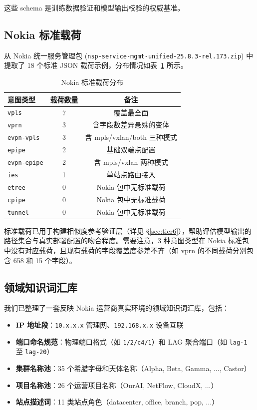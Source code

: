 \documentclass[12pt, a4paper]{article}
\newcommand{\intenttype}[1]{\texttt{#1}}
\begin{document}
\noindent
这些 schema 是训练数据验证和模型输出校验的权威基准。

\subsection{Nokia 标准载荷}

从 Nokia 统一服务管理包 (\texttt{nsp-service-mgmt-unified-25.8.3-rel.173.zip}) 中提取了 18 个标准 JSON 载荷示例，分布情况如表~\ref{tab:canonical-payloads} 所示。

\begin{table}[H]
\centering
\caption{Nokia 标准载荷分布}
\label{tab:canonical-payloads}
\small
\begin{tabular}{lcc}
\toprule
\textbf{意图类型} & \textbf{载荷数量} & \textbf{备注} \\
\midrule
\intenttype{vpls}        & 7 & 覆盖最全面 \\
\intenttype{vprn}        & 3 & 含字段数差异悬殊的变体 \\
\intenttype{evpn-vpls}   & 3 & 含 mpls/vxlan/both 三种模式 \\
\intenttype{epipe}       & 2 & 基础双端点配置 \\
\intenttype{evpn-epipe}  & 2 & 含 mpls/vxlan 两种模式 \\
\intenttype{ies}         & 1 & 单站点路由接入 \\
\midrule
\intenttype{etree}       & 0 & Nokia 包中无标准载荷 \\
\intenttype{cpipe}       & 0 & Nokia 包中无标准载荷 \\
\intenttype{tunnel}      & 0 & Nokia 包中无标准载荷 \\
\bottomrule
\end{tabular}
\end{table}

\noindent
标准载荷已用于构建相似度参考验证层（详见 \S\ref{sec:tier6}），帮助评估模型输出的路径集合与真实部署配置的吻合程度。需要注意，3 种意图类型在 Nokia 标准包中没有对应载荷，且现有载荷的字段覆盖度参差不齐（如 vprn 的不同载荷分别包含 658 和 15 个字段）。

\subsection{领域知识词汇库}

我们已整理了一套反映 Nokia 运营商真实环境的领域知识词汇库，包括：

\begin{itemize}
  \item \textbf{IP 地址段}：\texttt{10.x.x.x} 管理网、\texttt{192.168.x.x} 设备互联
  \item \textbf{端口命名规范}：物理端口格式（如 \texttt{1/2/c4/1}）和 LAG 聚合端口（如 \texttt{lag-1} 至 \texttt{lag-20}）
  \item \textbf{集群名称池}：35 个希腊字母和天体名称（Alpha, Beta, Gamma, ..., Castor）
  \item \textbf{项目名称池}：26 个运营项目名称（OurAI, NetFlow, CloudX, ...）
  \item \textbf{站点描述词}：11 类站点角色（datacenter, office, branch, pop, ...）
\end{itemize}
\end{document}

